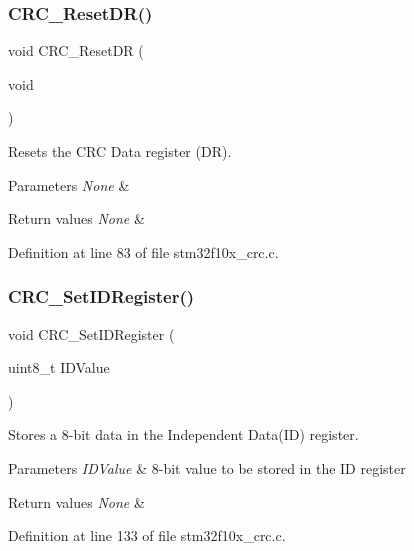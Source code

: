 \subsubsection{\texorpdfstring{C\+R\+C\+\_\+\+Reset\+D\+R()}{CRC\_ResetDR()}}
{\footnotesize\ttfamily void C\+R\+C\+\_\+\+Reset\+DR (\begin{DoxyParamCaption}\item[{void}]{ }\end{DoxyParamCaption})}



Resets the C\+RC Data register (DR). 


\begin{DoxyParams}{Parameters}
{\em None} & \\
\hline
\end{DoxyParams}

\begin{DoxyRetVals}{Return values}
{\em None} & \\
\hline
\end{DoxyRetVals}


Definition at line 83 of file stm32f10x\+\_\+crc.\+c.

\mbox{\label{group___c_r_c___exported___functions_ga769c9a42be57b972ae61bbada0f2e46a}} 
\subsubsection{\texorpdfstring{C\+R\+C\+\_\+\+Set\+I\+D\+Register()}{CRC\_SetIDRegister()}}
{\footnotesize\ttfamily void C\+R\+C\+\_\+\+Set\+I\+D\+Register (\begin{DoxyParamCaption}\item[{uint8\+\_\+t}]{I\+D\+Value }\end{DoxyParamCaption})}



Stores a 8-\/bit data in the Independent Data(\+I\+D) register. 


\begin{DoxyParams}{Parameters}
{\em I\+D\+Value} & 8-\/bit value to be stored in the ID register \\
\hline
\end{DoxyParams}

\begin{DoxyRetVals}{Return values}
{\em None} & \\
\hline
\end{DoxyRetVals}


Definition at line 133 of file stm32f10x\+\_\+crc.\+c.

